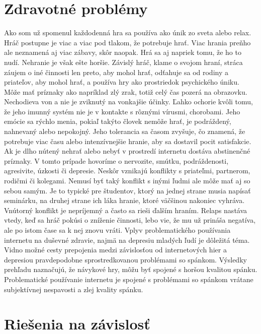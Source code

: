 \documentclass[10pt,twoside,english,a4paper]{article}
\begin{document}
\section{Zdravotné problémy} \label{zdrav_prob}

Ako som už spomenul každodenná hra sa používa ako únik zo sveta alebo relax. Hráč postupne je viac a viac pod tlakom, že potrebuje hrať. Viac hrania preňho ale neznamená aj viac zábavy, skôr naopak. Hrá sa aj napriek tomu, že ho to nudí. Nehranie je však ešte horšie. Závislý hráč, klame o svojom hraní, stráca záujem o iné činnosti len preto, aby mohol hrať, odťahuje sa od rodiny a priateľov, aby mohol hrať, a používa hry ako prostriedok psychického úniku. Môže mať príznaky ako napríklad zlý zrak, totiž celý čas pozerá na obrazovku. Nechodieva von a nie je zviknutý na vonkajšie účinky. Ľahko ochorie kvôli tomu, že jeho imunný systém nie je v kontakte s rôznými vírusmi, chorobami. Jeho emócie sa rýchlo menia, pokiaľ takýto človek nemôže hrať, je podráždený, nahnevaný alebo nepokojný. Jeho tolerancia sa časom zvyšuje, čo znamená, že potrebuje viac času alebo intenzívnejšie hranie, aby sa dostavil pocit satisfakcie. Ak je dlho nútený nehrať alebo nebyť v prostredí internetu dostáva abstinenčné príznaky. V tomto prípade hovoríme o nervozite, smútku, podráždenosti, agresivite, úzkosti či depresie. 
Neskôr vznikajú konflikty s priateľmi, partnerom, rodičmi či kolegami. Nemusí byť taký konflikt s inými ľudmi ale môže mať aj so sebou samým. Je to typické pre študentov, ktorý na jednej strane musia napísať seminárku, na druhej strane ich láka hranie, ktoré väčšinou nakoniec vyhráva. Vnútorný konflikt je nepríjemný a často sa rieši ďalším hraním. Relaps nastáva vtedy, keď sa hráč pokúsi o zníženie činnosti, lebo vie, že mu už prináša negatíva, ale po istom čase sa k nej znovu vráti. 
Vplyv problematického používania internetu na duševné zdravie, najmä na depresiu mladých ľudí je dôležitá téma. Vidno možné cesty prepojenia medzi závislosťou od internetových hier a depresiou pravdepodobne sprostredkovanou problémami so spánkom. Výsledky prehľadu naznačujú, že návykové hry, môžu byť spojené s horšou kvalitou spánku. Problematické používanie internetu je spojené s problémami so spánkom vrátane subjektívnej nespavosti a zlej kvality spánku.~\cite{Internet_Gaming_Addiction}

\section{Riešenia na závislosť} \label{ries}
\end{document}
